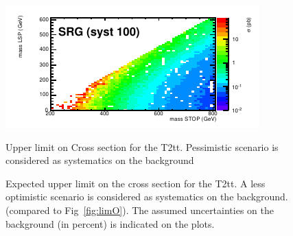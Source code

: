 \begin{figure}[hbt]
\begin{center}
        \includegraphics[width=0.5\linewidth]{plots/stopPlot/masses_SRG_xsecP.pdf}%
    \caption{Upper limit on Cross section for the T2tt. Pessimistic scenario is considered as systematics on the background}
\label{fig:SigEff}
    \caption{Expected upper limit on the cross section for the
      T2tt. A less optimistic scenario is considered as systematics on the
      background. (compared to Fig~\ref{fig:limO}).
The assumed uncertainties on the background (in percent) is indicated on the plots.}
\label{fig:limP}
      \end{center}
\end{figure}

\clearpage
